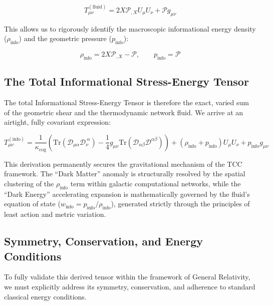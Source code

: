 \documentclass[12pt,openany]{book}
\theoremstyle{plain}
\theoremstyle{definition}
\theoremstyle{remark}
\begin{document}
\begin{equation}
T_{\mu\nu}^{(\text{fluid})} = 2X \mathcal{P}_{,X} U_\mu U_\nu + \mathcal{P} g_{\mu\nu}
\end{equation}

This allows us to rigorously identify the macroscopic informational energy density ($\rho_{\text{info}}$) and the geometric pressure ($p_{\text{info}}$):

\begin{equation}
\rho_{\text{info}} = 2X \mathcal{P}_{,X} - \mathcal{P}, \qquad p_{\text{info}} = \mathcal{P}
\end{equation}

\subsection{The Total Informational Stress-Energy Tensor}

The total Informational Stress-Energy Tensor is therefore the exact, varied sum of the geometric shear and the thermodynamic network fluid. We arrive at an airtight, fully covariant expression:

\begin{equation}
T_{\mu\nu}^{(\text{info})} = \frac{1}{\kappa_{\text{cog}}} \left( \text{Tr}(\mathcal{D}_{\mu\alpha} \mathcal{D}_{\nu}^{\ \alpha}) - \frac{1}{4} g_{\mu\nu} \text{Tr}(\mathcal{D}_{\alpha\beta} \mathcal{D}^{\alpha\beta}) \right) + (\rho_{\text{info}} + p_{\text{info}}) U_\mu U_\nu + p_{\text{info}} g_{\mu\nu}
\end{equation}

This derivation permanently secures the gravitational mechanism of the TCC framework. The ``Dark Matter'' anomaly is structurally resolved by the spatial clustering of the $\rho_{\text{info}}$ term within galactic computational networks, while the ``Dark Energy'' accelerating expansion is mathematically governed by the fluid's equation of state ($w_{\text{info}} = p_{\text{info}} / \rho_{\text{info}}$), generated strictly through the principles of least action and metric variation.

\subsection{Symmetry, Conservation, and Energy Conditions}

To fully validate this derived tensor within the framework of General Relativity, we must explicitly address its symmetry, conservation, and adherence to standard classical energy conditions.
\end{document}
